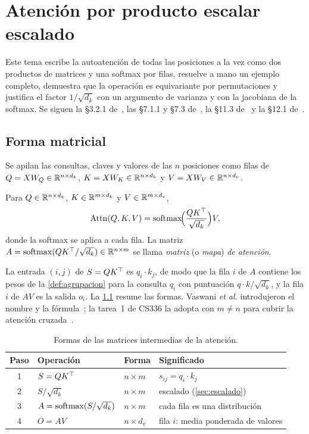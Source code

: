 \chapter{Atención por producto escalar escalado}
\label{tema:2}

Este tema escribe la autoatención de todas las posiciones a la vez como dos productos de matrices y una softmax por filas, resuelve a mano un ejemplo completo, demuestra que la operación es equivariante por permutaciones y justifica el factor $1/\sqrt{d_k}$ con un argumento de varianza y con la jacobiana de la softmax. Se siguen la §3.2.1 de~\cite{vaswani}, las §7.1.1 y §7.3 de~\cite{jm3}, la §11.3 de~\cite{d2l} y la §12.1 de~\cite{bishopdl}.

\section{Forma matricial}

Se apilan las consultas, claves y valores de las $n$ posiciones como filas de $Q=XW_{Q}\in\mathbb{R}^{n\times d_k}$, $K=XW_{K}\in\mathbb{R}^{n\times d_k}$ y $V=XW_{V}\in\mathbb{R}^{n\times d_v}$.

\begin{definicion}\label{def:sdpa}
Para $Q\in\mathbb{R}^{n\times d_k}$, $K\in\mathbb{R}^{m\times d_k}$ y $V\in\mathbb{R}^{m\times d_v}$,
\[
\operatorname{Attn}(Q,K,V)=\operatorname{softmax}\!\Bigl(\frac{QK^{\top}}{\sqrt{d_k}}\Bigr)V,
\]
donde la softmax se aplica a cada fila. La matriz $A=\operatorname{softmax}(QK^{\top}/\sqrt{d_k})\in\mathbb{R}^{n\times m}$ se llama \emph{matriz} (o \emph{mapa}) \emph{de atención}.
\end{definicion}

La entrada $(i,j)$ de $S=QK^{\top}$ es $q_i\cdot k_j$, de modo que la fila $i$ de $A$ contiene los pesos de la \cref{def:agrupacion} para la consulta $q_i$ con puntuación $q\cdot k/\sqrt{d_k}$, y la fila $i$ de $AV$ es la salida $o_i$. La \cref{tab:formas} resume las formas. Vaswani \emph{et al.} introdujeron el nombre y la fórmula~\cite[§3.2.1, ec.~(1)]{vaswani}; la tarea~1 de CS336 la adopta con $m\ne n$ para cubrir la atención cruzada~\cite[§3.4.4]{cs336}.

\begin{table}[h]
\centering
\begin{tabular}{@{}clll@{}}
\toprule
Paso & Operación & Forma & Significado \\
\midrule
1 & $S=QK^{\top}$ & $n\times m$ & $s_{ij}=q_i\cdot k_j$ \\
2 & $S/\sqrt{d_k}$ & $n\times m$ & escalado (\cref{sec:escalado}) \\
3 & $A=\operatorname{softmax}(S/\sqrt{d_k})$ & $n\times m$ & cada fila es una distribución \\
4 & $O=AV$ & $n\times d_v$ & fila $i$: media ponderada de valores \\
\bottomrule
\end{tabular}
\caption{Formas de las matrices intermedias de la atención.}
\label{tab:formas}
\end{table}

